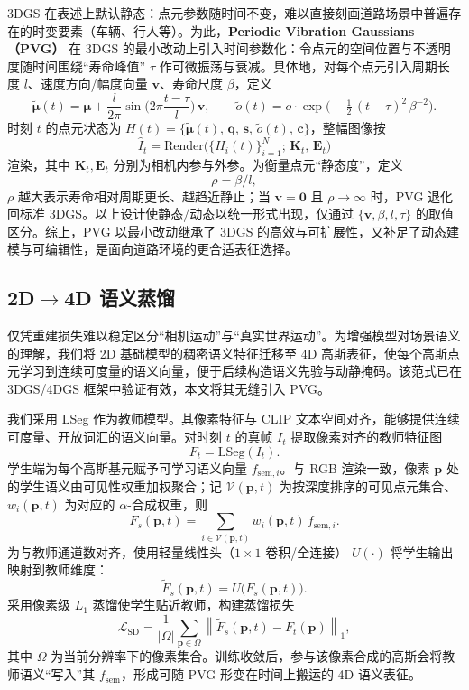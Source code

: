 \documentclass[10pt,conference]{IEEEtran} %
\begin{document}
3DGS 在表述上默认静态：点元参数随时间不变，难以直接刻画道路场景中普遍存在的时变要素（车辆、行人等）。为此，\textbf{Periodic Vibration Gaussians（PVG）} 在 3DGS 的最小改动上引入时间参数化：令点元的空间位置与不透明度随时间围绕“寿命峰值” $\tau$ 作可微振荡与衰减。具体地，对每个点元引入周期长度 $l$、速度方向/幅度向量 $\bm{v}$、寿命尺度 $\beta$，定义
\begin{equation}
\tilde{\bm{\mu}}(t)=\bm{\mu}+\frac{l}{2\pi}\sin\!\Big(2\pi\frac{t-\tau}{l}\Big)\,\bm{v},\qquad
\tilde o(t)=o\cdot \exp\!\Big(-\tfrac12\,(t-\tau)^2\,\beta^{-2}\Big).
\end{equation}
时刻 $t$ 的点元状态为 $H(t)=\{\tilde{\bm{\mu}}(t),\,\mathbf{q},\,\mathbf{s},\,\tilde o(t),\,\mathbf{c}\}$，整幅图像按
\begin{equation}
\hat I_t=\mathrm{Render}\big(\{H_i(t)\}_{i=1}^{N};\,\mathbf{K}_t,\,\mathbf{E}_t\big)
\end{equation}
渲染，其中 $\mathbf{K}_t,\mathbf{E}_t$ 分别为相机内参与外参。为衡量点元“静态度”，定义
\begin{equation}
\rho=\beta/l,
\end{equation}
$\rho$ 越大表示寿命相对周期更长、越趋近静止；当 $\bm{v}=\bm{0}$ 且 $\rho\to\infty$ 时，PVG 退化回标准 3DGS。以上设计使静态/动态以统一形式出现，仅通过 $\{\bm{v},\beta,l,\tau\}$ 的取值区分。综上，PVG 以最小改动继承了 3DGS 的高效与可扩展性，又补足了动态建模与可编辑性，是面向道路环境的更合适表征选择。

\subsection{2D$\to$4D 语义蒸馏}
仅凭重建损失难以稳定区分“相机运动”与“真实世界运动”。为增强模型对场景语义的理解，我们将 2D 基础模型的稠密语义特征迁移至 4D 高斯表征，使每个高斯点元学习到连续可度量的语义向量，便于后续构造语义先验与动静掩码。该范式已在 3DGS/4DGS 框架中验证有效，本文将其无缝引入 PVG。

我们采用 LSeg 作为教师模型。其像素特征与 CLIP 文本空间对齐，能够提供连续可度量、开放词汇的语义向量。对时刻 $t$ 的真帧 $I_t$ 提取像素对齐的教师特征图
\[
F_t=\mathrm{LSeg}(I_t).
\]
学生端为每个高斯基元赋予可学习语义向量 $f_{\text{sem},i}$。与 RGB 渲染一致，像素 $\mathbf p$ 处的学生语义由可见性权重加权聚合；记 $\mathcal V(\mathbf p,t)$ 为按深度排序的可见点元集合、$w_i(\mathbf p,t)$ 为对应的 $\alpha$-合成权重，则
\begin{equation}
F_s(\mathbf p,t)=\sum_{i\in\mathcal V(\mathbf p,t)} w_i(\mathbf p,t)\,f_{\text{sem},i}.
\label{eq:feature_render}
\end{equation}
为与教师通道数对齐，使用轻量线性头（$1{\times}1$ 卷积/全连接） $U(\cdot)$ 将学生输出映射到教师维度：
\[
\tilde F_s(\mathbf p,t)=U\!\big(F_s(\mathbf p,t)\big).
\]
采用像素级 $L_1$ 蒸馏使学生贴近教师，构建蒸馏损失
\[
\mathcal{L}_{\mathrm{SD}}
=\frac{1}{|\Omega|}\sum_{\mathbf p\in\Omega}\left\|\tilde F_s(\mathbf p,t)-F_t(\mathbf p)\right\|_1,
\]
其中 $\Omega$ 为当前分辨率下的像素集合。训练收敛后，参与该像素合成的高斯会将教师语义“写入”其 $f_{\mathrm{sem}}$，形成可随 PVG 形变在时间上搬运的 4D 语义表征。
\end{document}
